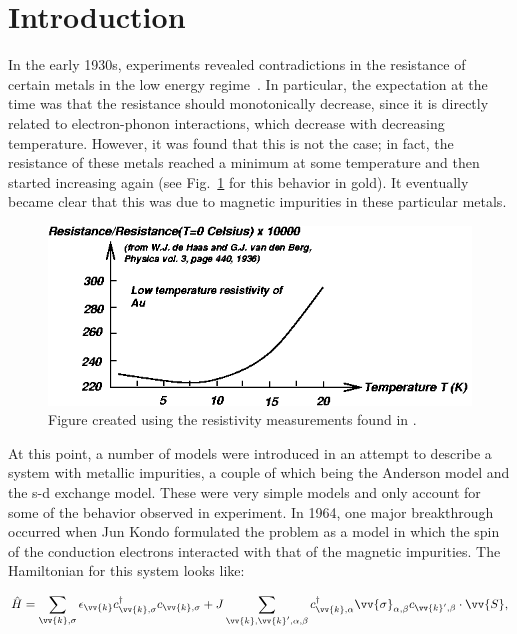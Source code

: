 \section{Introduction}

In the early 1930s, experiments revealed contradictions in the resistance of certain metals in the low energy regime~\cite{Meissner_1930}. In particular, the expectation at the time was that the resistance should monotonically decrease, since it is directly related to electron-phonon interactions, which decrease with decreasing temperature. However, it was found that this is not the case; in fact, the resistance of these metals reached a minimum at some temperature and then started increasing again (see Fig.~\ref{fig:classickondo} for this behavior in gold). It eventually became clear that this was due to magnetic impurities in these particular metals.

\begin{figure}[ht]
  \centering
  \includegraphics[width=0.6\linewidth]{../resources/gfx/classickondo.png}
  \caption{Figure created using the resistivity measurements found in \cite{DeHaas_1936}.}
  \label{fig:classickondo}
\end{figure}

At this point, a number of models were introduced in an attempt to describe a system with metallic impurities, a couple of which being the Anderson model and the s-d exchange model. These were very simple models and only account for some of the behavior observed in experiment. In 1964, one major breakthrough occurred when Jun Kondo formulated the problem as a model in which the spin of the conduction electrons interacted with that of the magnetic impurities. The Hamiltonian for this system looks like:

\begin{equation}
  \hat{H} = \sum_{\vv{k},\sigma} \epsilon_{\vv{k}}c_{\vv{k},\sigma}^\dagger c_{\vv{k},\sigma} + J\sum_{\vv{k},\vv{k}',\alpha,\beta} c_{\vv{k},\alpha}^\dagger \vv{\sigma}_{\alpha,\beta} c_{\vv{k}',\beta} \cdot \vv{S},\label{eq:kondo-hamiltonian}
\end{equation}

